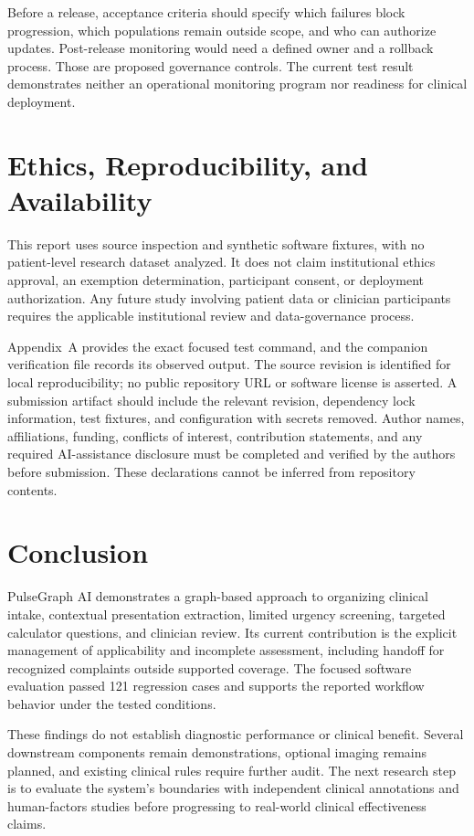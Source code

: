\documentclass[conference]{IEEEtran}
\begin{document}
Before a release, acceptance criteria should specify which failures block progression, which populations remain outside scope, and who can authorize updates. Post-release monitoring would need a defined owner and a rollback process. Those are proposed governance controls. The current test result demonstrates neither an operational monitoring program nor readiness for clinical deployment.

\section{Ethics, Reproducibility, and Availability}
This report uses source inspection and synthetic software fixtures, with no patient-level research dataset analyzed. It does not claim institutional ethics approval, an exemption determination, participant consent, or deployment authorization. Any future study involving patient data or clinician participants requires the applicable institutional review and data-governance process.

Appendix~A provides the exact focused test command, and the companion verification file records its observed output. The source revision is identified for local reproducibility; no public repository URL or software license is asserted. A submission artifact should include the relevant revision, dependency lock information, test fixtures, and configuration with secrets removed. Author names, affiliations, funding, conflicts of interest, contribution statements, and any required AI-assistance disclosure must be completed and verified by the authors before submission. These declarations cannot be inferred from repository contents.

\section{Conclusion}
PulseGraph AI demonstrates a graph-based approach to organizing clinical intake, contextual presentation extraction, limited urgency screening, targeted calculator questions, and clinician review. Its current contribution is the explicit management of applicability and incomplete assessment, including handoff for recognized complaints outside supported coverage. The focused software evaluation passed 121 regression cases and supports the reported workflow behavior under the tested conditions.

These findings do not establish diagnostic performance or clinical benefit. Several downstream components remain demonstrations, optional imaging remains planned, and existing clinical rules require further audit. The next research step is to evaluate the system's boundaries with independent clinical annotations and human-factors studies before progressing to real-world clinical effectiveness claims.
\end{document}
